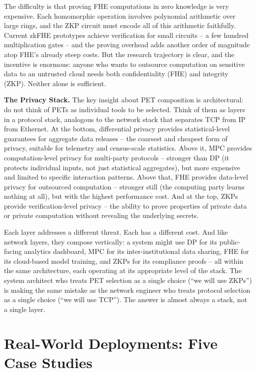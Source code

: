 \documentclass[
  11pt,
  openany]{report}
\renewcommand{\textbf}[1]{{\bfseries\color{MidnightBold}#1}}
\begin{document}
The difficulty is that proving FHE computations in zero knowledge is very
expensive. Each homomorphic operation involves polynomial arithmetic over large
rings, and the ZKP circuit must encode all of this arithmetic faithfully.
Current zkFHE prototypes achieve verification for small circuits -- a few
hundred multiplication gates -- and the proving overhead adds another order of
magnitude atop FHE's already steep costs. But the research trajectory is clear,
and the incentive is enormous: anyone who wants to outsource computation on
sensitive data to an untrusted cloud needs both confidentiality (FHE) and
integrity (ZKP). Neither alone is sufficient.

\textbf{The Privacy Stack.} The key insight about PET composition is
architectural: do not think of PETs as individual tools to be selected. Think of
them as layers in a protocol stack, analogous to the network stack that
separates TCP from IP from Ethernet. At the bottom, differential privacy
provides statistical-level guarantees for aggregate data releases -- the
coarsest and cheapest form of privacy, suitable for telemetry and census-scale
statistics. Above it, MPC provides computation-level privacy for multi-party
protocols -- stronger than DP (it protects individual inputs, not just
statistical aggregates), but more expensive and limited to specific interaction
patterns. Above that, FHE provides data-level privacy for outsourced computation
-- stronger still (the computing party learns nothing at all), but with the
highest performance cost. And at the top, ZKPs provide verification-level
privacy -- the ability to prove properties of private data or private
computation without revealing the underlying secrets.

Each layer addresses a different threat. Each has a different cost. And like
network layers, they compose vertically: a system might use DP for its
public-facing analytics dashboard, MPC for its inter-institutional data sharing,
FHE for its cloud-based model training, and ZKPs for its compliance proofs --
all within the same architecture, each operating at its appropriate level of the
stack. The system architect who treats PET selection as a single choice (``we
will use ZKPs'') is making the same mistake as the network engineer who treats
protocol selection as a single choice (``we will use TCP''). The answer is
almost always a stack, not a single layer.

\section{Real-World Deployments: Five Case
Studies}\label{real-world-deployments-five-case-studies}
\end{document}
